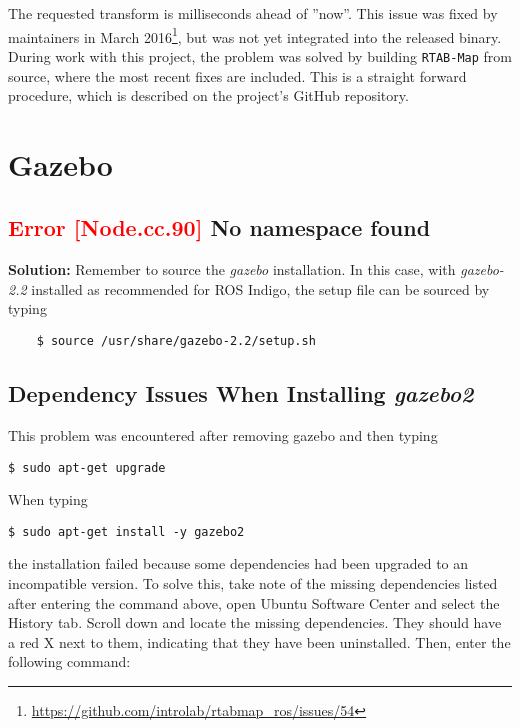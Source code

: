 The requested transform is milliseconds ahead of ''now''. This issue was fixed by maintainers in March 2016\footnote{\url{https://github.com/introlab/rtabmap_ros/issues/54}}, but was not yet integrated into the released binary. During work with this project, the problem was solved by building \texttt{RTAB-Map} from source, where the most recent fixes are included. This is a straight forward procedure, which is described on the project's GitHub repository. 

\section{Gazebo}

\subsection*{\textcolor{red}{Error [Node.cc.90]} No namespace found}

\textbf{Solution: } Remember to source the \textit{gazebo} installation. In this case, with \textit{gazebo-2.2} installed as recommended for \ac{ROS} Indigo, the setup file can be sourced by typing

\begin{verbatim}
	$ source /usr/share/gazebo-2.2/setup.sh
\end{verbatim}

\subsection*{Dependency Issues When Installing \textit{gazebo2}}

This problem was encountered after removing gazebo and then typing

\begin{verbatim}
$ sudo apt-get upgrade
\end{verbatim}

When typing 

\begin{verbatim}
$ sudo apt-get install -y gazebo2
\end{verbatim}

the installation failed because some dependencies had been upgraded to an incompatible version. To solve this, take note of the missing dependencies listed after entering the command above, open Ubuntu Software Center and select the History tab. Scroll down and locate the missing dependencies. They should have a red X next to them, indicating that they have been uninstalled. Then, enter the following command:

